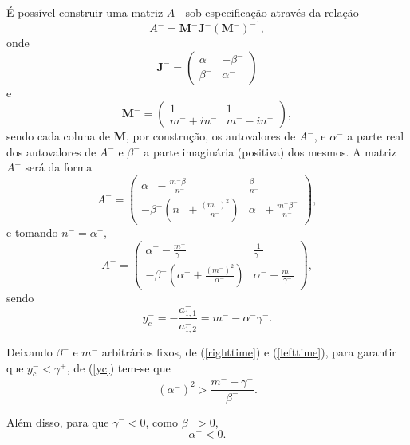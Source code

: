 É possível construir uma matriz $A^-$ sob especificação através da relação
\[
A^-=\mathbf{M}^-\mathbf{J}^-(\mathbf{M}^-)^{-1},
\]
onde
\[
\mathbf{J}^{-}=\left(\begin{array}{cc}
\alpha^{-} & -\beta^{-} \\
\beta^{-} & \alpha^{-}
\end{array}\right)
\]
e
\[
\mathbf{M^-}=\left(\begin{array}{cc}
1 & 1 \\
m^-+in^- & m^--in^- 
\end{array}\right),
\]
sendo cada coluna de $\mathbf{M}$, por construção,  os autovalores de $A^-$, e $\alpha^-$ a parte real dos autovalores de $A^-$ e $\beta^-$ a parte imaginária (positiva) dos mesmos. A matriz $A^-$ será da forma
\[
A^-=
\begin{pmatrix}
\alpha^--\frac{m^-\beta^-}{n^-}& \frac{\beta^-}{n^-}\\ 
-\beta^-\left(n^-+\frac{(m^-)^2}{n^-}\right)& \alpha^-+\frac{m^-\beta^-}{n^-}
\end{pmatrix},
\]
e tomando $n^-=\alpha^-$, 
\begin{equation}
\label{amin}
A^-=
\begin{pmatrix}
\alpha^--\frac{m^-}{\gamma^-}& \frac{1}{\gamma^-}\\ 
-\beta^-\left(\alpha^-+\frac{(m^-)^2}{\alpha^-}\right)& \alpha^-+\frac{m^-}{\gamma^-}
\end{pmatrix},
\end{equation}
sendo
\begin{equation}
\label{yc}
y_c^-=-\frac{a^-_{1,1}}{a^-_{1,2}}=m^--\alpha^-\gamma^-.
\end{equation}

Deixando $\beta^-$ e $m^-$ arbitrários fixos, de (\ref{righttime}) e (\ref{lefttime}), para garantir que $y_c^-<\gamma^+$, de (\ref{yc}) tem-se que
\begin{equation}
\label{yc_gammaplus}
(\alpha^-)^2>\frac{m^--\gamma^+}{\beta^-}.
\end{equation}

Além disso, para que $\gamma^-<0$, como $\beta^->0$,
\begin{equation}
\label{alphaneg}
\alpha^-<0.
\end{equation}

